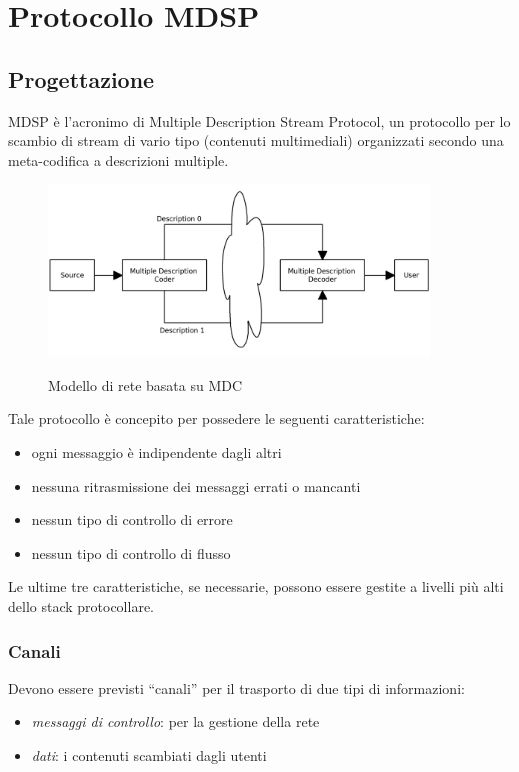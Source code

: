 \chapter{Protocollo MDSP}

\label{cap:protocollo}

\section{Progettazione}


MDSP è l'acronimo di Multiple Description Stream Protocol, un protocollo
per lo scambio di stream di vario tipo (contenuti multimediali) organizzati secondo una
meta-codifica a descrizioni multiple.

\begin{figure}[hb]
\includegraphics[width=0.90\textwidth]{../images/network_mdc.png}
\label{fig:network_mdc}
\caption{Modello di rete basata su MDC}
\end{figure}

Tale protocollo è concepito per possedere le seguenti caratteristiche:
\begin{itemize}
  \item ogni messaggio è indipendente dagli altri
  \item nessuna ritrasmissione dei messaggi errati o mancanti
  \item nessun tipo di controllo di errore
  \item nessun tipo di controllo di flusso 
\end{itemize}

Le ultime tre caratteristiche, se necessarie, possono essere gestite a livelli
più alti dello stack protocollare.



\subsection{Canali}
Devono essere previsti ``canali'' per il trasporto di due tipi di informazioni:
\begin{itemize}
  \item \emph{messaggi di controllo}: per la gestione della rete
  \item \emph{dati}: i contenuti scambiati dagli utenti
\end{itemize}




